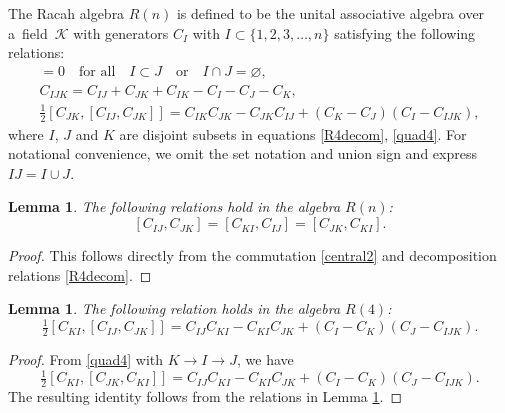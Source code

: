\documentclass[10pt,a4paper]{amsart}
\numberwithin{equation}{section}
\newtheorem{Lemma}[Theorem]{Lemma}
\begin{document}
\begin{Definition}
The Racah algebra $R(n)$ is defined to be the unital associative algebra over a~field~$\mathcal{K}$ with generators $C_{I}$ with $I \subset \{ 1,2,3, \dots, {n}\}$ satisfying the following relations:
\begin{gather}
[C_{I},C_{J}] = 0\quad \mbox{for all}\quad I \subset J\quad \mbox{or}\quad I \cap J = \varnothing, \label{central2}\\
C_{IJK}=C_{IJ}+C_{JK}+C_{IK}-C_I -C_J-C_K, \label{R4decom}\\
\tfrac12 [C_{JK},[C_{IJ}, C_{JK}]]= C_{IK}C_{JK}-C_{JK}C_{IJ}+(C_K-C_J)(C_I-C_{IJK}) \label{quad4},
\end{gather}
where $I$, $J$ and $K$ are disjoint subsets in equations \eqref{R4decom}, \eqref{quad4}. For notational convenience, we omit the set notation and union sign and express $IJ=I \cup J$.
\end{Definition}
\begin{Lemma} \label{permutationsymofDs}
The following relations hold in the algebra $R(n)$:
\[
[C_{IJ}, C_{JK}]=[C_{KI}, C_{IJ}] =[C_{JK}, C_{KI}].
\]
\end{Lemma}
\begin{proof}
 This follows directly from the commutation \eqref{central2} and decomposition relations \eqref{R4decom}.
 \end{proof}
\begin{Lemma} The following relation holds in the algebra $R(4)$:
\begin{equation}
\tfrac12 [C_{KI},[C_{IJ}, C_{JK}]]= C_{IJ}C_{KI}-C_{KI}C_{JK}+(C_I-C_K)(C_J-C_{IJK}). \label{quad4b}
\end{equation}
\end{Lemma}
\begin{proof}
 From \eqref{quad4} with $K\rightarrow I \rightarrow J$, we have
\[\tfrac12 [C_{KI},[C_{JK}, C_{KI}]]= C_{IJ}C_{KI}-C_{KI}C_{JK}+(C_I-C_K)(C_J-C_{IJK}).\]
The resulting identity follows from the relations in Lemma \ref{permutationsymofDs}.
\end{proof}
\end{document}
